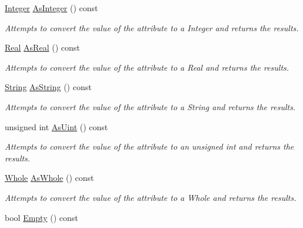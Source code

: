 \begin{DoxyCompactItemize}
\hyperlink{namespaceMezzanine_ac3576e52af3c62d13dde94829e0c5465}{Integer} \hyperlink{classMezzanine_1_1xml_1_1Attribute_a30f5709d3d40f9397c59a852d7b4a238}{AsInteger} () const 
\begin{DoxyCompactList}\small\item\em Attempts to convert the value of the attribute to a Integer and returns the results. \item\end{DoxyCompactList}\item 
\hyperlink{namespaceMezzanine_a726731b1a7df72bf3583e4a97282c6f6}{Real} \hyperlink{classMezzanine_1_1xml_1_1Attribute_a94bfba016ee52f80b1560a374185a3e9}{AsReal} () const 
\begin{DoxyCompactList}\small\item\em Attempts to convert the value of the attribute to a Real and returns the results. \item\end{DoxyCompactList}\item 
\hyperlink{namespaceMezzanine_1_1xml_a3ddf35656ecc38b6fa1d0364d9ad3b2c}{String} \hyperlink{classMezzanine_1_1xml_1_1Attribute_a65938b76fcd1ee7a9950d3eab06c4b41}{AsString} () const 
\begin{DoxyCompactList}\small\item\em Attempts to convert the value of the attribute to a String and returns the results. \item\end{DoxyCompactList}\item 
unsigned int \hyperlink{classMezzanine_1_1xml_1_1Attribute_a5933a59c21bf71049ea71750f4c69bc3}{AsUint} () const 
\begin{DoxyCompactList}\small\item\em Attempts to convert the value of the attribute to an unsigned int and returns the results. \item\end{DoxyCompactList}\item 
\hyperlink{namespaceMezzanine_adcbb6ce6d1eb4379d109e51171e2e493}{Whole} \hyperlink{classMezzanine_1_1xml_1_1Attribute_aaea08c5ea3d1578592e9f59932b674f5}{AsWhole} () const 
\begin{DoxyCompactList}\small\item\em Attempts to convert the value of the attribute to a Whole and returns the results. \item\end{DoxyCompactList}\item 
bool \hyperlink{classMezzanine_1_1xml_1_1Attribute_af0729c966ed4f385e8791eb4c904b82f}{Empty} () const 

\end{DoxyCompactItemize}
